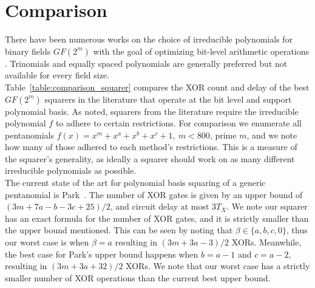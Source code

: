 \section{Comparison} \label{comparison}

There have been numerous works on the choice of irreducible polynomials for binary fields $GF(2^m)$ with the goal of optimizing bit-level arithmetic operations \cite{fan2015survey}. Trinomials and equally spaced polynomials are generally preferred but not available for every field size. \\

Table~\ref{table:comparison_squarer} compares the XOR count and delay of the best $GF(2^m)$ squarers in the literature that operate at the bit level and support polynomial basis. As noted, squarers from the literature require the irreducible polynomial $f$ to adhere to certain restrictions. For comparison we enumerate all pentanomials $f(x) = x^m + x^a + x^b + x^c + 1,~m < 800$, prime $m$, and we note how many of those adhered to each method's restrictions. This is a measure of the squarer's generality, as ideally a squarer should work on as many different irreducible polynomials as possible. \\

The current state of the art for polynomial basis squaring of a generic pentanomial is Park~\cite{park2012explicit}. The number of XOR gates is given by an upper bound of $(3m+7a-b-3c+25)/2$, and circuit delay at most $3T_X$. We note our squarer has an exact formula for the number of XOR gates, and it is strictly smaller than the upper bound mentioned. This can be seen by noting that $\beta \in \{a, b,c, 0\}$, thus our worst case is when $\beta = a$ resulting in $(3m+3a-3)/2$ XORs. Meanwhile, the best case for Park's upper bound happens when $b=a-1$ and $c=a-2$, resulting in $(3m+3a+32)/2$ XORs. We note that our worst case has a strictly smaller number of XOR operations than the current best upper bound. \\

